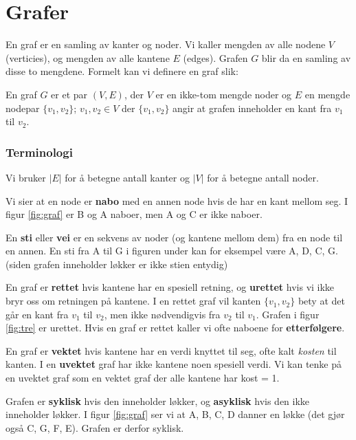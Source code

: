 \section{Grafer}
En graf er en samling av kanter og noder. Vi kaller mengden av alle nodene $ V $ (verticies), og mengden av alle kantene $ E $ (edges). Grafen $ G $ blir da en samling av disse to mengdene. Formelt kan vi definere en graf slik: 

\begin{definition}
En graf $ G $  er et par $ (V, E) $, der $ V $ er en ikke-tom mengde noder og $ E $ en mengde nodepar $ \{v_1, v_2\} $; $ v_1, v_2 \in V $ der $ \{v_1, v_2\} $ angir at grafen inneholder en kant fra $ v_1 $ til $ v_2 $.
\end{definition}


\subsubsection{Terminologi}
Vi bruker $ |E| $ for å betegne antall kanter og $ |V| $ for å betegne antall noder. 

Vi sier at en node er \textbf{nabo} med en annen node hvis de har en kant mellom seg. I figur \ref{fig:graf} er B og A naboer, men A og C er ikke naboer. 

En \textbf{sti} eller \textbf{vei} er en sekvens av noder (og kantene mellom dem) fra en node til en annen. En sti fra A til G i figuren under kan for eksempel være A, D, C, G. (siden grafen inneholder løkker er ikke stien entydig) 

En graf er \textbf{rettet} hvis kantene har en spesiell retning, og \textbf{urettet} hvis vi ikke bryr oss om retningen på kantene. I en rettet graf vil kanten $ \{v_1, v_2\} $ bety at det går en kant fra $ v_1 $ til $ v_2 $, men ikke nødvendigvis fra $ v_2 $ til $ v_1 $. Grafen i figur \ref{fig:tre} er urettet. Hvis en graf er rettet kaller vi ofte naboene for \textbf{etterfølgere}.  

En graf er \textbf{vektet} hvis kantene har en verdi knyttet til seg, ofte kalt \emph{kosten} til kanten. I en \textbf{uvektet} graf har ikke kantene noen spesiell verdi. Vi kan tenke på en uvektet graf som en vektet graf der alle kantene har kost = 1. 

Grafen er \textbf{syklisk} hvis den inneholder løkker, og \textbf{asyklisk} hvis den ikke inneholder løkker. I figur \ref{fig:graf} ser vi at A, B, C, D danner en løkke (det gjør også C, G, F, E). Grafen er derfor syklisk.

